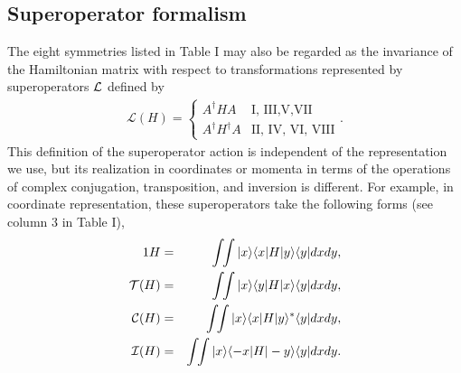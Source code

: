 %
%
\subsection{Superoperator formalism \label{super}}
%
%
%
The eight symmetries listed in Table I may also be regarded as the invariance
of the Hamiltonian matrix with respect to
transformations represented by superoperators ${\cal L}$ \cite{Simon2018} defined by
%
\begin{eqnarray}
\mathcal{L}(H)=
	\begin{cases}
      A^\dagger H A &  \text{I, III,V,VII} \\
      A^\dagger H^\dagger A &\text{II, IV, VI, VIII}
   \end{cases}.
\end{eqnarray}
%
%
%
This definition of the superoperator action is independent of the representation we use, but its realization
in coordinates or momenta in terms of the operations of complex conjugation, transposition, and inversion is different.
For example, in coordinate representation, these superoperators take the following forms (see column 3 in Table I),
%
\begin{eqnarray}
1 H&=&\int\!\!\int |x\ra \la x|H|y\ra\la y| dx dy,
\nonumber\\
{\cal T} (H) &=&\int\!\!\int |x\ra \la y|H|x\ra\la y| dx dy,
\nonumber\\
{\cal C} (H)&=&\int\!\!\int |x\ra \la x|H|y\ra^*\la y| dx dy,
\nonumber\\
{\cal I} (H)&=&\int\!\!\int |x\ra \la -x|H|-y\ra\la y| dx dy.
\label{defs}
\end{eqnarray}
%
